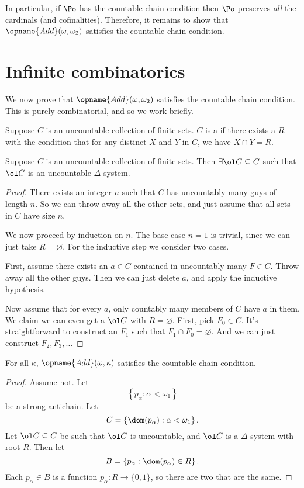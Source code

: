 In particular, if $\Po$ has the countable chain condition then $\Po$ preserves \emph{all} the cardinals (and cofinalities).
Therefore, it remains to show that $\opname{Add}(\omega, \omega_2)$ satisfies the countable chain condition.

\section{Infinite combinatorics}
We now prove that $\opname{Add}(\omega, \omega_2)$ satisfies the countable chain condition.
This is purely combinatorial, and so we work briefly.

\begin{definition}
	Suppose $C$ is an uncountable collection of finite sets.
	$C$ is a  if there exists a  $R$
	with the condition that for any distinct $X$ and $Y$
	in $C$, we have $X \cap Y = R$.
\end{definition}

\begin{lemma}
	 Suppose $C$ is an uncountable collection of finite sets.
	Then $\exists \ol C \subseteq C$ such that $\ol C$ is an uncountable $\Delta$-system.
\end{lemma}
\begin{proof}
	There exists an integer $n$ such that $C$ has uncountably many guys of length $n$.
	So we can throw away all the other sets, and just assume that all sets in $C$ have size $n$.

	We now proceed by induction on $n$.
	The base case $n=1$ is trivial, since we can just take $R = \varnothing$.
	For the inductive step we consider two cases.

	First, assume there exists an $a \in C$ contained in uncountably many $F \in C$.
	Throw away all the other guys.
	Then we can just delete $a$, and apply the inductive hypothesis.

	Now assume that for every $a$, only countably many members of $C$ have $a$ in them.
	We claim we can even get a $\ol C$ with $R = \varnothing$.
	First, pick $F_0 \in C$.
	It's straightforward to construct an $F_1$ such that $F_1 \cap F_0 = \varnothing$.
	And we can just construct $F_2, F_3, \dots$
\end{proof}

\begin{lemma}
	For all $\kappa$, $\opname{Add}(\omega, \kappa)$ satisfies the countable chain condition.
\end{lemma}
\begin{proof}
	Assume not. Let
	\[ \left\{ p_\alpha : \alpha < \omega_1 \right\} \]
	be a strong antichain.  Let
	\[ C = \left\{ \dom(p_\alpha) : \alpha < \omega_1 \right\}. \]
	Let $\ol C \subseteq C$ be such that $\ol C$ is uncountable, and $\ol C$ is a $\Delta$-system with root $R$.
	Then let
	\[ B = \left\{ p_\alpha : \dom(p_\alpha) \in R \right\}. \]
	Each $p_\alpha \in B$ is a function $p_\alpha : R \to \{0,1\}$,
	so there are two that are the same.
\end{proof}

